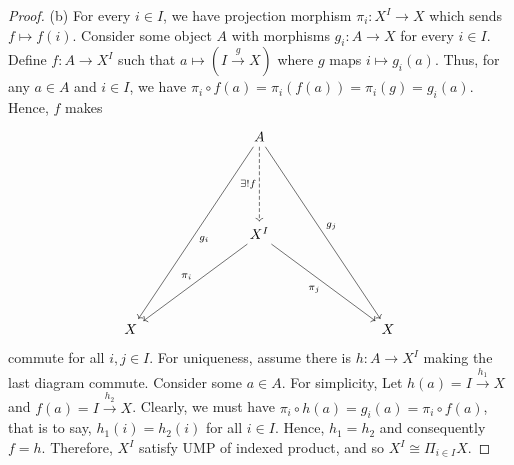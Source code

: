 \documentclass[a4paper, 11pt]{book}
\theoremstyle{plain}
\theoremstyle{plain}
\newcommand{\arr}{\rightarrow}
\newcommand{\warr}{\xrightarrow}
\newcommand{\iso}{\cong}
\begin{document}
\begin{proof}
    (b) For every $i \in I$, we have projection morphism $\pi_i:X^I \arr X$ which sends $f \mapsto f(i)$. Consider some object $A$ with morphisms $g_i:A \arr X$ for every $i \in I$. Define $f:A \arr X^I$ such that $a \mapsto (I \warr{g} X)$ where $g$ maps $i \mapsto g_i(a)$. Thus, for any $a \in A$ and $i \in I$, we have $\pi_i \circ f (a)=\pi_i(f(a))=\pi_i (g)=g_i(a)$. Hence, $f$ makes 
    \[\begin{tikzcd}
      &&& A \\
      \\
      \\
      &&& {X^I} \\
      \\
      \\
      X &&&&&& X
      \arrow["{\exists ! f}"', dashed, from=1-4, to=4-4]
      \arrow["{g_i}", from=1-4, to=7-1]
      \arrow["{g_j}", from=1-4, to=7-7]
      \arrow["{\pi_i}"', from=4-4, to=7-1]
      \arrow["{\pi_j}"', from=4-4, to=7-7]
    \end{tikzcd}\]
    commute for all $i,j \in I$. For uniqueness, assume there is $h:A \arr X^I$ making the last diagram commute. Consider some $a \in A$. For simplicity, Let $h(a)=I \warr{h_1} X$ and $f(a)=I \warr{h_2} X$. Clearly, we must have $\pi_i \circ h(a) = g_i(a)=\pi_i \circ f(a)$, that is to say, $h_1(i)=h_2(i)$ for all $i \in I$. Hence, $h_1=h_2$ and consequently $f=h$. Therefore, $X^I$ satisfy UMP of indexed product, and so $X^I \iso \Pi_{i \in I} X$.
  \end{proof}
\end{document}
